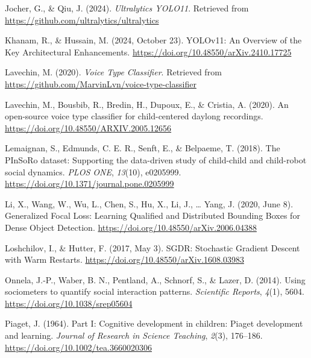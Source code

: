 \documentclass[
  man,floatsintext]{apa6}
\newlength{\cslhangindent}
\newenvironment{CSLReferences}[2] %
 {\begin{list}{}{%
  \setlength{\itemindent}{0pt}
  \setlength{\leftmargin}{0pt}
  \setlength{\parsep}{0pt}
  \ifodd #1
   \setlength{\leftmargin}{\cslhangindent}
   \setlength{\itemindent}{-1\cslhangindent}
  \fi
  \setlength{\itemsep}{#2\baselineskip}}}
 {\end{list}}
\begin{document}
\begin{CSLReferences}{1}{0}
Jocher, G., \& Qiu, J. (2024). \emph{Ultralytics {YOLO11}}. Retrieved from \url{https://github.com/ultralytics/ultralytics}

Khanam, R., \& Hussain, M. (2024, October 23). {YOLOv11}: {An Overview} of the {Key Architectural Enhancements}. \url{https://doi.org/10.48550/arXiv.2410.17725}

Lavechin, M. (2020). \emph{Voice {Type Classifier}}. Retrieved from \url{https://github.com/MarvinLvn/voice-type-classifier}

Lavechin, M., Bousbib, R., Bredin, H., Dupoux, E., \& Cristia, A. (2020). An open-source voice type classifier for child-centered daylong recordings. \url{https://doi.org/10.48550/ARXIV.2005.12656}

Lemaignan, S., Edmunds, C. E. R., Senft, E., \& Belpaeme, T. (2018). The {PInSoRo} dataset: {Supporting} the data-driven study of child-child and child-robot social dynamics. \emph{PLOS ONE}, \emph{13}(10), e0205999. \url{https://doi.org/10.1371/journal.pone.0205999}

Li, X., Wang, W., Wu, L., Chen, S., Hu, X., Li, J., \ldots{} Yang, J. (2020, June 8). Generalized {Focal Loss}: {Learning Qualified} and {Distributed Bounding Boxes} for {Dense Object Detection}. \url{https://doi.org/10.48550/arXiv.2006.04388}

Loshchilov, I., \& Hutter, F. (2017, May 3). {SGDR}: {Stochastic Gradient Descent} with {Warm Restarts}. \url{https://doi.org/10.48550/arXiv.1608.03983}

Onnela, J.-P., Waber, B. N., Pentland, A., Schnorf, S., \& Lazer, D. (2014). Using sociometers to quantify social interaction patterns. \emph{Scientific Reports}, \emph{4}(1), 5604. \url{https://doi.org/10.1038/srep05604}

Piaget, J. (1964). Part {I}: {Cognitive} development in children: {Piaget} development and learning. \emph{Journal of Research in Science Teaching}, \emph{2}(3), 176--186. \url{https://doi.org/10.1002/tea.3660020306}


\end{CSLReferences}
\end{document}

